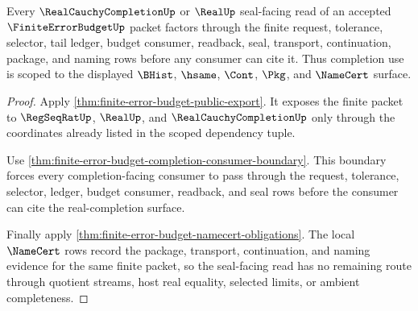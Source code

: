 \begin{theorem}
\label{thm:finite-error-budget-real-completion-seal-scope}
Every $\RealCauchyCompletionUp$ or $\RealUp$ seal-facing read of an accepted
$\FiniteErrorBudgetUp$ packet factors through the finite request, tolerance,
selector, tail ledger, budget consumer, readback, seal, transport,
continuation, package, and naming rows before any consumer can cite it. Thus
completion use is scoped to the displayed $\BHist$, $\hsame$, $\Cont$, $\Pkg$,
and $\NameCert$ surface.
\end{theorem}
\begin{proof}
Apply \autoref{thm:finite-error-budget-public-export}. It exposes the finite
packet to $\RegSeqRatUp$, $\RealUp$, and $\RealCauchyCompletionUp$ only through
the coordinates already listed in the scoped dependency tuple.

Use \autoref{thm:finite-error-budget-completion-consumer-boundary}. This
boundary forces every completion-facing consumer to pass through the request,
tolerance, selector, ledger, budget consumer, readback, and seal rows before
the consumer can cite the real-completion surface.

Finally apply \autoref{thm:finite-error-budget-namecert-obligations}. The
local $\NameCert$ rows record the package, transport, continuation, and naming
evidence for the same finite packet, so the seal-facing read has no remaining
route through quotient streams, host real equality, selected limits, or
ambient completeness.
\end{proof}

